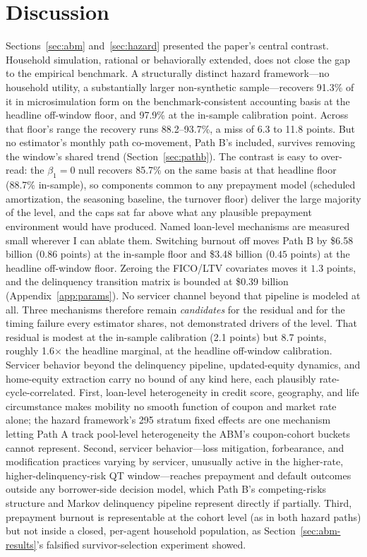 \documentclass[12pt]{article}
\begin{document}
\section{Discussion}\label{sec:discussion}

Sections~\ref{sec:abm} and~\ref{sec:hazard} presented the paper's central contrast. Household simulation, rational or behaviorally extended, does not close the gap to the empirical benchmark. A structurally distinct hazard framework---no household utility, a substantially larger non-synthetic sample---recovers 91.3\% of it in microsimulation form on the benchmark-consistent accounting basis at the headline off-window floor, and 97.9\% at the in-sample calibration point. Across that floor's range the recovery runs 88.2--93.7\%, a miss of 6.3 to 11.8 points. But no estimator's monthly path co-movement, Path B's included, survives removing the window's shared trend (Section~\ref{sec:pathb}). The contrast is easy to over-read: the $\beta_1 = 0$ null recovers 85.7\% on the same basis at that headline floor (88.7\% in-sample), so components common to any prepayment model (scheduled amortization, the seasoning baseline, the turnover floor) deliver the large majority of the level, and the caps sat far above what any plausible prepayment environment would have produced. Named loan-level mechanisms are measured small wherever I can ablate them. Switching burnout off moves Path B by \$6.58 billion ($0.86$ points) at the in-sample floor and \$3.48 billion ($0.45$ points) at the headline off-window floor. Zeroing the FICO/LTV covariates moves it $1.3$ points, and the delinquency transition matrix is bounded at \$0.39 billion (Appendix~\ref{app:params}). No servicer channel beyond that pipeline is modeled at all. Three mechanisms therefore remain \emph{candidates} for the residual and for the timing failure every estimator shares, not demonstrated drivers of the level. That residual is modest at the in-sample calibration (2.1 points) but 8.7 points, roughly 1.6$\times$ the headline marginal, at the headline off-window calibration. Servicer behavior beyond the delinquency pipeline, updated-equity dynamics, and home-equity extraction carry no bound of any kind here, each plausibly rate-cycle-correlated. First, loan-level heterogeneity in credit score, geography, and life circumstance makes mobility no smooth function of coupon and market rate alone; the hazard framework's 295 stratum fixed effects are one mechanism letting Path A track pool-level heterogeneity the ABM's coupon-cohort buckets cannot represent. Second, servicer behavior---loss mitigation, forbearance, and modification practices varying by servicer, unusually active in the higher-rate, higher-delinquency-risk QT window---reaches prepayment and default outcomes outside any borrower-side decision model, which Path B's competing-risks structure and Markov delinquency pipeline represent directly if partially. Third, prepayment burnout is representable at the cohort level (as in both hazard paths) but not inside a closed, per-agent household population, as Section~\ref{sec:abm-results}'s falsified survivor-selection experiment showed.
\end{document}
